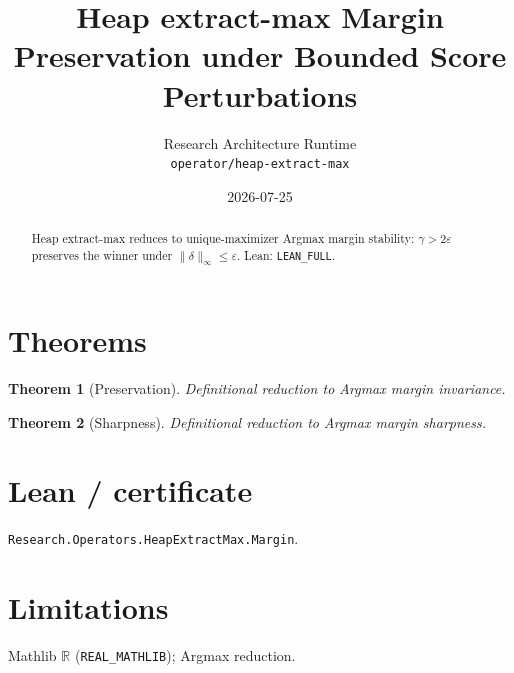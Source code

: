\documentclass[11pt]{article}
\title{Heap extract-max Margin Preservation under Bounded Score Perturbations}
\author{Research Architecture Runtime \\ \texttt{operator/heap-extract-max}}
\date{2026-07-25}
\newtheorem{theorem}{Theorem}
\begin{document}
\maketitle
\begin{abstract}
Heap extract-max reduces to unique-maximizer Argmax margin stability: $\gamma>2\varepsilon$
preserves the winner under $\|\delta\|_\infty\le\varepsilon$. Lean: \texttt{LEAN\_FULL}.
\end{abstract}
\section{Theorems}
\begin{theorem}[Preservation]
Definitional reduction to Argmax margin invariance.
\end{theorem}
\begin{theorem}[Sharpness]
Definitional reduction to Argmax margin sharpness.
\end{theorem}
\section{Lean / certificate}
\texttt{Research.Operators.HeapExtractMax.Margin}.
\section{Limitations}
Mathlib $\mathbb{R}$ (\texttt{REAL\_MATHLIB}); Argmax reduction.
\end{document}
